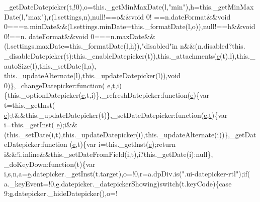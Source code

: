 \begin{DoxyCode}
      \_getDateDatepicker(t,!0),o=this.\_getMinMaxDate(l,\textcolor{stringliteral}{"min"}),h=this.\_getMinMaxDate(l,\textcolor{stringliteral}{"max"}),r(l.settings,n),null!==o&&\textcolor{keywordtype}{void} 0!
      ==n.dateFormat&&\textcolor{keywordtype}{void} 0===n.minDate&&(l.settings.minDate=this.\_formatDate(l,o)),null!==h&&\textcolor{keywordtype}{void} 0!==n.
      dateFormat&&\textcolor{keywordtype}{void} 0===n.maxDate&&(l.settings.maxDate=\textcolor{keyword}{this}.\_formatDate(l,h)),\textcolor{stringliteral}{"disabled"}in n&&(n.disabled?\textcolor{keyword}{this}.
      \_disableDatepicker(t):this.\_enableDatepicker(t)),this.\_attachments(\hyperlink{jquery-ui_8min_8js_a2c038346d47955cbe2cb91e338edd7e1}{e}(t),l),this.\_autoSize(l),this.\_setDate(l,a),
      this.\_updateAlternate(l),this.\_updateDatepicker(l)),\textcolor{keywordtype}{void} 0)\},\_changeDatepicker:\textcolor{keyword}{function}(
      \hyperlink{jquery-ui_8min_8js_a2c038346d47955cbe2cb91e338edd7e1}{e},\hyperlink{jquery-2_80_83_8min_8js_aaccc9105df5383111407fd5b41255e23}{t},i)\{this.\_optionDatepicker(\hyperlink{jquery-ui_8min_8js_a2c038346d47955cbe2cb91e338edd7e1}{e},t,i)\},\_refreshDatepicker:\textcolor{keyword}{function}(\hyperlink{jquery-ui_8min_8js_a2c038346d47955cbe2cb91e338edd7e1}{e})\{var t=this.\_getInst(
      \hyperlink{jquery-ui_8min_8js_a2c038346d47955cbe2cb91e338edd7e1}{e});t&&this.\_updateDatepicker(t)\},\_setDateDatepicker:\textcolor{keyword}{function}(\hyperlink{jquery-ui_8min_8js_a2c038346d47955cbe2cb91e338edd7e1}{e},\hyperlink{jquery-2_80_83_8min_8js_aaccc9105df5383111407fd5b41255e23}{t})\{var i=this.\_getInst(
      \hyperlink{jquery-ui_8min_8js_a2c038346d47955cbe2cb91e338edd7e1}{e});i&&(this.\_setDate(i,t),this.\_updateDatepicker(i),this.\_updateAlternate(i))\},\_getDateDatepicker:\textcolor{keyword}{function}
      (\hyperlink{jquery-ui_8min_8js_a2c038346d47955cbe2cb91e338edd7e1}{e},t)\{var i=this.\_getInst(\hyperlink{jquery-ui_8min_8js_a2c038346d47955cbe2cb91e338edd7e1}{e});\textcolor{keywordflow}{return} i&&!i.inline&&this.\_setDateFromField(i,t),i?this.\_getDate(i):null\},
      \_doKeyDown:function(t)\{var i,s,n,a=\hyperlink{jquery-ui_8min_8js_a2c038346d47955cbe2cb91e338edd7e1}{e}.datepicker.\_getInst(t.target),o=!0,r=a.dpDiv.is(\textcolor{stringliteral}{".ui-datepicker-rtl"});\textcolor{keywordflow}{if}(
      a.\_keyEvent=!0,\hyperlink{jquery-ui_8min_8js_a2c038346d47955cbe2cb91e338edd7e1}{e}.datepicker.\_datepickerShowing)\textcolor{keywordflow}{switch}(t.keyCode)\{\textcolor{keywordflow}{case} 9:\hyperlink{jquery-ui_8min_8js_a2c038346d47955cbe2cb91e338edd7e1}{e}.datepicker.\_hideDatepicker(),o=!

\end{DoxyCode}
